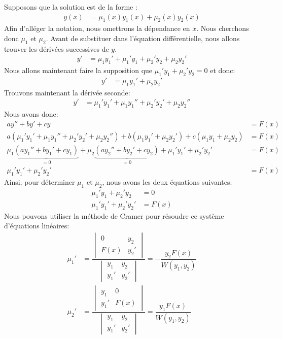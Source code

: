 \documentclass[]{book}
\theoremstyle{definition}
\theoremstyle{definition}
\theoremstyle{definition}
\theoremstyle{remark}
\begin{document}
Supposons que la solution est de la forme : \begin{align*}
y(x) &= \mu_1(x)y_1(x)+\mu_2(x)y_2(x)
\end{align*} Afin d'alléger la notation, nous omettrons la dépendance en
\(x\). Nous cherchons donc \(\mu_1\) et \(\mu_2\). Avant de substituer
dans l'équation différentielle, nous allons trouver les dérivées
successives de \(y\). \begin{align*}
y' &= \mu_1y_1'+\mu_1'y_1+\mu_2'y_2+\mu_2y_2'
\end{align*} Nous allons maintenant faire la supposition que
\(\mu_1'y_1+\mu_2'y_2=0\) et donc: \begin{align*}
y' &= \mu_1y_1'+\mu_2y_2'
\end{align*} Trouvons maintenant la dérivée seconde: \begin{align*}
y' &= \mu_1'y_1'+\mu_1y_1''+\mu_2'y_2'+\mu_2y_2''
\end{align*} Nous avons donc: \begin{align*}
ay''+by'+cy &= F(x) \\
a(\mu_1'y_1'+\mu_1y_1''+\mu_2'y_2'+\mu_2y_2'')+b(\mu_1y_1'+\mu_2y_2')+c(\mu_1y_1+\mu_2y_2) &= F(x) \\
\mu_1\underbrace{(ay_1''+by_1'+cy_1)}_{=0}+\mu_2\underbrace{(ay_2''+by_2'+cy_2)}_{=0}+\mu_1'y_1'+\mu_2'y_2' &= F(x) \\
\mu_1'y_1'+\mu_2'y_2' &= F(x)
\end{align*} Ainsi, pour déterminer \(\mu_1\) et \(\mu_2\), nous avons
les deux équations suivantes: \begin{align*}
\mu_1'y_1+\mu_2'y_2 &= 0 \\
\mu_1'y_1'+\mu_2'y_2' &= F(x)
\end{align*} Nous pouvons utiliser la méthode de Cramer pour résoudre ce
système d'équations linéaires: \begin{align*}
\mu_1'&= \dfrac{
\begin{vmatrix}
0&y_2\\
F(x)&y_2'
\end{vmatrix}}{
\begin{vmatrix}
y_1 &y_2\\
y_1'&y_2'
\end{vmatrix}
}=-\dfrac{y_2F(x)}{W(y_1,y_2)}\\
\mu_2'&= \dfrac{
\begin{vmatrix}
y_1&0\\
y_1'&F(x)
\end{vmatrix}}{
\begin{vmatrix}
y_1 &y_2\\
y_1'&y_2'
\end{vmatrix}
}=\dfrac{y_1F(x)}{W(y_1,y_2)}
\end{align*}
\end{document}
